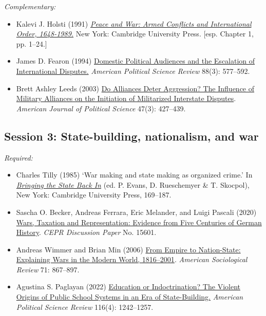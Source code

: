 \documentclass[12pt, a4paper]{article}
\begin{document}
\noindent\textit{Complementary:}

\begin{itemize}
  \item Kalevi J. Holsti (1991) \href{https://www.cambridge.org/core/books/peace-and-war/37AEB58913E6EF0834D40EFE086D32FE}{\textit{Peace and War: Armed Conflicts and International Order, 1648-1989.}} New York: Cambridge University Press. [esp. Chapter 1, pp. 1--24.]
  \item James D. Fearon (1994) \href{https://doi.org/10.2307/2944796}{Domestic Political Audiences and the Escalation of International Disputes.} \textit{American Political Science Review} 88(3): 577--592.
	\item Brett Ashley Leeds (2003) \href{https://doi.org/10.1111/1540-5907.00031}{Do Alliances Deter Aggression? The Influence of Military Alliances on the Initiation of Militarized Interstate Disputes}. \textit{American Journal of Political Science} 47(3): 427--439.
\end{itemize}

\subsection*{Session 3: State-building, nationalism, and war}

\noindent\textit{Required:}

\begin{itemize}
  \item Charles Tilly (1985) `War making and state making as organized crime.' In \href{https://bibliotecas.uc3m.es/permalink/f/1qk6at5/34UC3M_ALMA21176158990004213}{\textit{Bringing the State Back In}} (ed. P. Evans, D. Rueschemyer \& T. Skocpol), New York: Cambridge University Press, 169--187.
	\item Sascha O. Becker, Andreas Ferrara, Eric Melander, and Luigi Pascali (2020) \href{https://cepr.org/publications/dp15601}{Wars, Taxation and Representation: Evidence from Five Centuries of German History}. \textit{CEPR Discussion Paper} No. 15601.
	\item Andreas Wimmer and Brian Min (2006) \href{https://doi.org/10.1177/000312240607100601}{From Empire to Nation-State: Explaining Wars in the Modern World, 1816–2001}. \textit{American Sociological Review} 71: 867--897.
  \item Agustina S. Paglayan (2022) \href{https://doi.org/10.1017/S0003055422000247}{Education or Indoctrination? The Violent Origins of Public School Systems in an Era of State-Building.} \textit{American Political Science Review} 116(4): 1242--1257.
\end{itemize}
\end{document}
